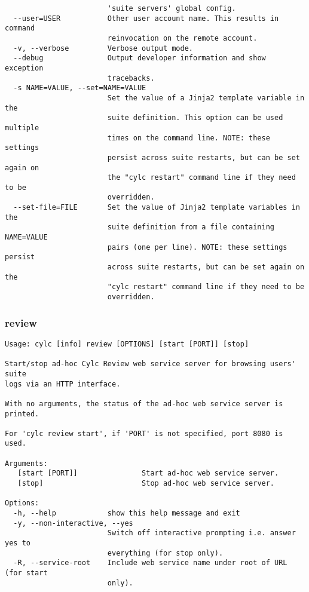 \begin{lstlisting}
                        'suite servers' global config.
  --user=USER           Other user account name. This results in command
                        reinvocation on the remote account.
  -v, --verbose         Verbose output mode.
  --debug               Output developer information and show exception
                        tracebacks.
  -s NAME=VALUE, --set=NAME=VALUE
                        Set the value of a Jinja2 template variable in the
                        suite definition. This option can be used multiple
                        times on the command line. NOTE: these settings
                        persist across suite restarts, but can be set again on
                        the "cylc restart" command line if they need to be
                        overridden.
  --set-file=FILE       Set the value of Jinja2 template variables in the
                        suite definition from a file containing NAME=VALUE
                        pairs (one per line). NOTE: these settings persist
                        across suite restarts, but can be set again on the
                        "cylc restart" command line if they need to be
                        overridden.
\end{lstlisting}
\subsubsection{review}
\label{review}
\begin{lstlisting}
Usage: cylc [info] review [OPTIONS] [start [PORT]] [stop] 

Start/stop ad-hoc Cylc Review web service server for browsing users' suite
logs via an HTTP interface.

With no arguments, the status of the ad-hoc web service server is printed.

For 'cylc review start', if 'PORT' is not specified, port 8080 is used.

Arguments:
   [start [PORT]]               Start ad-hoc web service server.
   [stop]                       Stop ad-hoc web service server.

Options:
  -h, --help            show this help message and exit
  -y, --non-interactive, --yes
                        Switch off interactive prompting i.e. answer yes to
                        everything (for stop only).
  -R, --service-root    Include web service name under root of URL (for start
                        only).
\end{lstlisting}
